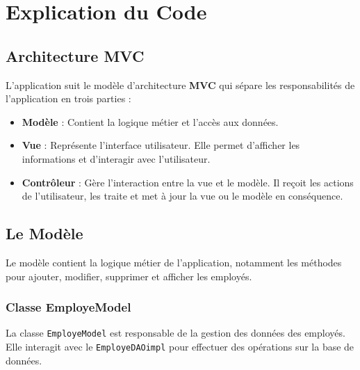 \documentclass[a4paper,12pt]{report}
\begin{document}
\chapter{Explication du Code}
\section{Architecture MVC}
L'application suit le modèle d'architecture \textbf{MVC} qui sépare les responsabilités de l'application en trois parties :
\begin{itemize}
    \item \textbf{Modèle} : Contient la logique métier et l'accès aux données.
    \item \textbf{Vue} : Représente l'interface utilisateur. Elle permet d'afficher les informations et d'interagir avec l'utilisateur.
    \item \textbf{Contrôleur} : Gère l'interaction entre la vue et le modèle. Il reçoit les actions de l'utilisateur, les traite et met à jour la vue ou le modèle en conséquence.
\end{itemize}

\section{Le Modèle}
Le modèle contient la logique métier de l'application, notamment les méthodes pour ajouter, modifier, supprimer et afficher les employés.

\subsection{Classe EmployeModel}
La classe \texttt{EmployeModel} est responsable de la gestion des données des employés. Elle interagit avec le \texttt{EmployeDAOimpl} pour effectuer des opérations sur la base de données.
\end{document}
